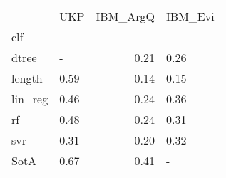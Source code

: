 \begin{tabular}{llrl}
\toprule
{} &   UKP &  IBM\_ArgQ & IBM\_Evi \\
clf     &       &           &         \\
\midrule
dtree   &     - &      0.21 &    0.26 \\
length  &  0.59 &      0.14 &    0.15 \\
lin\_reg &  0.46 &      0.24 &    0.36 \\
rf      &  0.48 &      0.24 &    0.31 \\
svr     &  0.31 &      0.20 &    0.32 \\
SotA    &  0.67 &      0.41 &       - \\
\bottomrule
\end{tabular}

